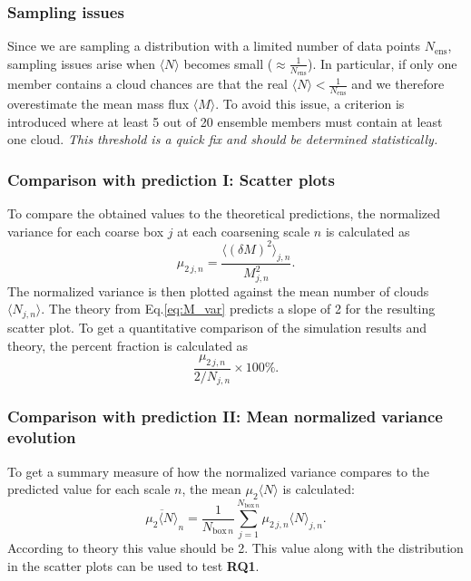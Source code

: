 \documentclass[a4paper, 12pt]{article}
\begin{document}
\subsubsection{Sampling issues}
Since we are sampling a distribution with a limited number of data points $N_{\mathrm{ens}}$, sampling issues arise when $\langle N \rangle$ becomes small ($\approx \frac{1}{N_{\mathrm{ens}}}$). In particular, if only one member contains a cloud chances are that the real $\langle N \rangle < \frac{1}{N_{\mathrm{ens}}}$ and we therefore overestimate the mean mass flux $\langle M \rangle$. To avoid this issue, a criterion is introduced where at least 5 out of 20 ensemble members must contain at least one cloud. \textit{This threshold is a quick fix and should be determined statistically.}

\subsubsection{Comparison with prediction I: Scatter plots}
To compare the obtained values to the theoretical predictions, the normalized variance for each coarse box $j$ at each coarsening scale $n$ is calculated as 
\begin{equation} \label{eq:normalized_variance}
 \mu_{2\,j, n} = \frac{\langle (\delta M )^2 \rangle_{j,n}}{M_{j,n}^2}.
\end{equation}
The normalized variance is then plotted against the mean number of clouds $\langle N_{j,n} \rangle$. The theory from Eq.\ref{eq:M_var} predicts a slope of 2 for the resulting scatter plot. To get a quantitative comparison of the simulation results and theory, the percent fraction is calculated as
\begin{equation} \label{eq:normalized_variance_percent}
 \frac{\mu_{2\,j, n}}{2 / N_{j,n}}\times 100\%.
\end{equation}

\subsubsection{Comparison with prediction II: Mean normalized variance evolution}
To get a summary measure of how the normalized variance compares to the predicted value for each scale $n$, the mean $\mu_{2} \langle N \rangle$ is calculated:
\begin{equation} \label{eq:mean_nvar_n}
 \overline{\mu_{2}\langle N \rangle}_n = \frac{1}{N_{\mathrm{box}\,n}} \sum_{j=1}^{N_{\mathrm{box}\,n}} \mu_{2\,j,n}\langle N \rangle_{j,n}.
\end{equation}
According to theory this value should be 2. This value along with the distribution in the scatter plots can be used to test \textbf{RQ1}. 
\end{document}
